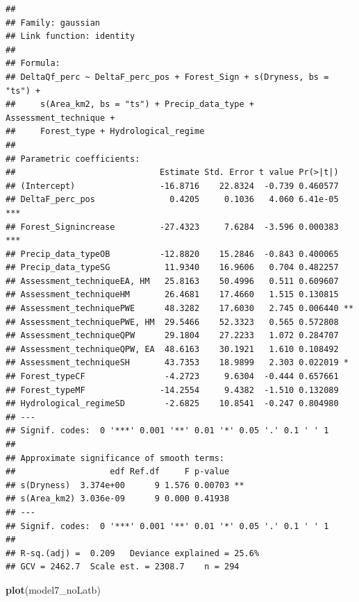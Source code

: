 \documentclass[]{elsarticle} %
\newenvironment{Shaded}{\begin{snugshade}}{\end{snugshade}}
\newcommand{\KeywordTok}[1]{\textcolor[rgb]{0.13,0.29,0.53}{\textbf{#1}}}
\newcommand{\NormalTok}[1]{#1}
\begin{document}
\begin{verbatim}
## 
## Family: gaussian 
## Link function: identity 
## 
## Formula:
## DeltaQf_perc ~ DeltaF_perc_pos + Forest_Sign + s(Dryness, bs = "ts") + 
##     s(Area_km2, bs = "ts") + Precip_data_type + Assessment_technique + 
##     Forest_type + Hydrological_regime
## 
## Parametric coefficients:
##                             Estimate Std. Error t value Pr(>|t|)    
## (Intercept)                 -16.8716    22.8324  -0.739 0.460577    
## DeltaF_perc_pos               0.4205     0.1036   4.060 6.41e-05 ***
## Forest_Signincrease         -27.4323     7.6284  -3.596 0.000383 ***
## Precip_data_typeOB          -12.8820    15.2846  -0.843 0.400065    
## Precip_data_typeSG           11.9340    16.9606   0.704 0.482257    
## Assessment_techniqueEA, HM   25.8163    50.4996   0.511 0.609607    
## Assessment_techniqueHM       26.4681    17.4660   1.515 0.130815    
## Assessment_techniquePWE      48.3282    17.6030   2.745 0.006440 ** 
## Assessment_techniquePWE, HM  29.5466    52.3323   0.565 0.572808    
## Assessment_techniqueQPW      29.1804    27.2233   1.072 0.284707    
## Assessment_techniqueQPW, EA  48.6163    30.1921   1.610 0.108492    
## Assessment_techniqueSH       43.7353    18.9899   2.303 0.022019 *  
## Forest_typeCF                -4.2723     9.6304  -0.444 0.657661    
## Forest_typeMF               -14.2554     9.4382  -1.510 0.132089    
## Hydrological_regimeSD        -2.6825    10.8541  -0.247 0.804980    
## ---
## Signif. codes:  0 '***' 0.001 '**' 0.01 '*' 0.05 '.' 0.1 ' ' 1
## 
## Approximate significance of smooth terms:
##                   edf Ref.df     F p-value   
## s(Dryness)  3.374e+00      9 1.576 0.00703 **
## s(Area_km2) 3.036e-09      9 0.000 0.41938   
## ---
## Signif. codes:  0 '***' 0.001 '**' 0.01 '*' 0.05 '.' 0.1 ' ' 1
## 
## R-sq.(adj) =  0.209   Deviance explained = 25.6%
## GCV = 2462.7  Scale est. = 2308.7    n = 294
\end{verbatim}

\begin{Shaded}
\begin{Highlighting}[]
\KeywordTok{plot}\NormalTok{(model7_noLatb)}
\end{Highlighting}
\end{Shaded}
\end{document}
